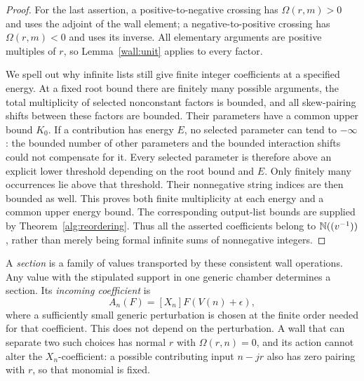 \begin{proof}
For the last assertion, a positive-to-negative crossing has
$\Omega(r,m)>0$ and uses the adjoint of the wall element; a
negative-to-positive crossing has $\Omega(r,m)<0$ and uses its
inverse.  All elementary arguments are positive multiples of $r$,
so Lemma~\ref{wall:unit} applies to every factor.

We spell out why infinite lists still give finite integer
coefficients at a specified energy.  At a fixed root bound there
are finitely many possible arguments, the total multiplicity of
selected nonconstant factors is bounded, and all skew-pairing
shifts between these factors are bounded.  Their parameters have a
common upper bound $K_0$.  If a contribution has energy $E$, no
selected parameter can tend to $-\infty$: the bounded number of
other parameters and the bounded interaction shifts could not
compensate for it.  Every selected parameter is therefore above
an explicit lower threshold depending on the root bound and $E$.
Only finitely many occurrences lie above that threshold.  Their
nonnegative string indices are then bounded as well.  This proves
both finite multiplicity at each energy and a common upper energy
bound.  The corresponding output-list bounds are supplied by
Theorem~\ref{alg:reordering}.  Thus all the asserted coefficients
belong to $\mathbb N((v^{-1}))$, rather than merely being formal infinite
sums of nonnegative integers.
\end{proof}

A \emph{section} is a family of values transported by these
consistent wall operations.  Any value with the stipulated support
in one generic chamber determines a section.  Its \emph{incoming
coefficient} is
\begin{equation}
 A_n(F)=[X_n]F(V(n)+\epsilon),
 \label{wall:incoming-coordinate}
\end{equation}
where a sufficiently small generic perturbation is chosen at the
finite order needed for that coefficient.  This does not depend on
the perturbation.  A wall that can separate two such choices has
normal $r$ with $\Omega(r,n)=0$, and its action cannot alter the
$X_n$-coefficient: a possible contributing input $n-jr$ also has
zero pairing with $r$, so that monomial is fixed.


